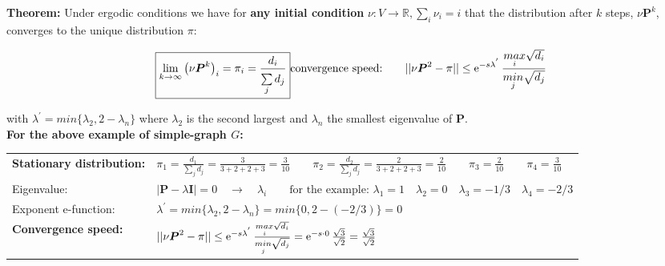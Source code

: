 \textbf{Theorem: } Under ergodic conditions we have for \textbf{any initial condition} $\nu: V \rightarrow \mathbb{R}, \sum\limits_{i}^{}{\nu_i=i}$ that the distribution after $k$ steps, $\nu\bm{P}^k$, converges to the unique distribution $\pi$:

\begin{equation}
	\boxed{\lim\limits_{k \rightarrow \infty}{\big(\nu\boldsymbol{P}^k\big)_i}=\pi_i=\frac{d_i}{\sum\limits_{j}^{}{d_j}}}\\
	\text{convergence speed:\qquad} ||\nu\boldsymbol{P}^2-\pi || \leq \operatorname{\mathrm e}^{-s\lambda^{'}}\frac{\underset{i}{max}\sqrt{d_i}}{\underset{j}{min}\sqrt{d_j}}\nonumber\\
\end{equation}

with $\lambda^{'}=min\{\lambda_2,2-\lambda_n\}$ where $\lambda_2$ is the second largest and $\lambda_n$ the smallest eigenvalue of $\bm{P}$.\\

\textbf{For the above example of simple-graph $G$: } 

\renewcommand{\arraystretch}{2.0}
\begin{tabular}{ll}
\textbf{Stationary distribution: }& $\pi_1=\frac{d_1}{\sum\limits_j{d_j}}=\frac{3}{3+2+2+3}=\frac 3 {10} \qquad \pi_2=\frac{d_2}{\sum\limits_j{d_j}}=\frac{2}{3+2+2+3}=\frac 2 {10}  \qquad \pi_3=\frac 2 {10}  \qquad \pi_4=\frac 3 {10}$\\
Eigenvalue: & $|\bm{P}-\lambda\bm{I}|=0\quad \rightarrow \quad \lambda_i\qquad \text{for the example: }\lambda_1=1\quad\lambda_2=0\quad\lambda_3=-1/3\quad\lambda_4=-2/3$\\
Exponent e-function: & $\lambda^{'}=min\{\lambda_2,2-\lambda_n\}=min\{0,2-(-2/3)\}=0$\\
\textbf{Convergence speed: }& $||\nu\boldsymbol{P}^2-\pi || \leq \operatorname{\mathrm e}^{-s\lambda^{'}}\frac{\underset{i}{max}\sqrt{d_i}}{\underset{j}{min}\sqrt{d_j}}=\operatorname{\mathrm e}^{-s\cdot 0} \frac{\sqrt{3}}{\sqrt{2}}=\frac{\sqrt{3}}{\sqrt{2}}$
\end{tabular}
\renewcommand{\arraystretch}{1.0}












